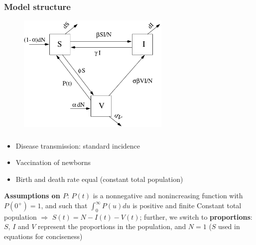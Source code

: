 \documentclass[aspectratio=43]{beamer}
\begin{document}
\begin{frame}\frametitle{Model structure}
\begin{figure}[htbp]
  \begin{center}
    \includegraphics[width=0.65\textwidth]{FIGS/vaccination_newborns_integral}
  \end{center}
\end{figure}
\end{frame}

\begin{frame}\frametitle{}
\begin{itemize}
\item Disease transmission: standard incidence
\vfill
\item Vaccination of newborns
\vfill
\item Birth and death rate equal (\imply constant total population)
\end{itemize}

\textbf{Assumptions on $P$}: $P(t)$ is a nonnegative and nonincreasing
function with $P(0^+)=1$, and such that $\int_0^\infty P(u)du$ is
positive and finite
\vfill
Constant total population $\Rightarrow$ $S(t)=N-I(t)-V(t)$; further, we
switch to \textbf{proportions}: $S$, $I$ and $V$ represent the
proportions in the population, and $N=1$ ($S$ used in equations for
conciseness)
\end{frame}
\end{document}
